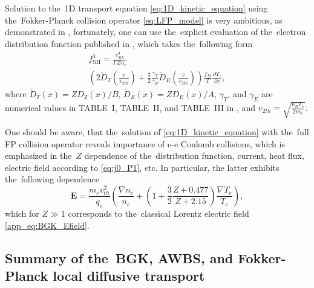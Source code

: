 \documentclass[
 aps,
 jmp,
 amsmath,amssymb,
 twocolumn,
]{revtex4-1}
\newcommand{\pdv}[2]{\frac{\partial{#1}}{\partial{#2}}}
\newcommand{\vect}[1]{\boldsymbol{#1}}
\newcommand{\Zbar}{Z}
\newcommand{\vmag}{v}
\newcommand{\vth}{v_{th}}
\newcommand{\vtwoh}{v_{2 th}}
\newcommand{\E}{\vect{E}}
\newcommand{\qe}{q_e}
\newcommand{\me}{m_e}
\newcommand{\kB}{k_B}
\newcommand{\fM}{f_M}
\newcommand{\ft}{f}
\begin{document}
Solution to the~1D transport equation \eqref{eq:1D_kinetic_equation}
using the~Fokker-Planck collision operator \eqref{eq:LFP_model}
is very ambitious, as demonstrated in 
\cite{Chandrasekhar_RMP1943, CSR_1950, Rosenbluth_PR1957}, fortunately, one 
can use the~explicit evaluation of the~electron distribution function
published in \cite{SpitzerHarm_PR1953}, which takes the~following form
\begin{multline}
  \ft^1_{\text{SH}} =
  \frac{\vtwoh^4}{\Gamma\Zbar n_e}\\
  \left( 2\tilde{D}_T\left(\frac{\vmag}{\vtwoh}\right) 
  + \frac{3}{2}\frac{\gamma_T}{\gamma_E} 
  \tilde{D}_E\left(\frac{\vmag}{\vtwoh}\right) \right)%
  \frac{\fM}{T}\pdv{T_e}{z}  ,
  \label{eq:f1_SH}
\end{multline}
where $\tilde{D}_T(x) = \Zbar D_{T}(x) / B$, 
$\tilde{D}_E(x) = \Zbar D_{E}(x) / A$, $\gamma_T$,
and $\gamma_E$ are numerical values in TABLE~I, TABLE~II, and
TABLE~III in \cite{SpitzerHarm_PR1953}, and 
$\vtwoh = \sqrt{\frac{\kB T_e}{2\me}}$.

One should be aware, that the~solution of \eqref{eq:1D_kinetic_equation}
with the~full FP collision operator reveals importance of
e-e Coulomb collisions, which is emphasized in the~$\Zbar$ dependence 
of the~distribution function, current, heat flux, 
electric field according to \eqref{eq:j0_P1}, etc.
In particular, the latter exhibits the~following dependence 
\cite{SpitzerHarm_PR1953}
\begin{equation}
  \E = \frac{\me \vth^2}{\qe}
  \left(\frac{\nabla n_e}{n_e} + 
  \left(1 + \frac{3}{2}\frac{\Zbar + 0.477}{\Zbar + 2.15} \right)
  \frac{\nabla T_e}{T_e} \right),
  \label{eq:SH_Efield} 
\end{equation}
which for $\Zbar\gg1$ corresponds to the~classical Lorentz electric field 
\eqref{app_eq:BGK_Efield}.

\subsection{Summary of the~BGK, AWBS, and Fokker-Planck local diffusive 
transport}
\label{sec:SummaryDiffusiveKinetics}
\end{document}

